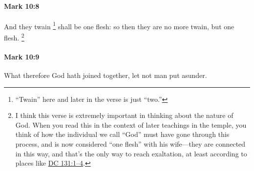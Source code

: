 		\paragraph{Mark 10:8} %
			\label{MARK-10-8}

			And they twain%
				\footnote{%
					``Twain'' here and later in the verse is just ``two.''
					}
			shall be one flesh: so then they are no more twain, but one flesh.%
				\footnote{%
					I think this verse is extremely important in thinking about the nature of God. When you read this in the context of later teachings in the temple, you think of how the individual we call ``God'' must have gone through this process, and is now considered ``one flesh'' with his wife---they are connected in this way, and that's the only way to reach exaltation, at least according to places like \hyperref[DC131-1]{DC 131:1--4}.
					}

			\begin{framed}
			\scriptsize
				\begin{compactdesc}
					\item[SBLG] 
				\end{compactdesc}
			\end{framed}

		\paragraph{Mark 10:9} %
			\label{MARK-10-9}

			What therefore God hath joined together, let not man put asunder.

